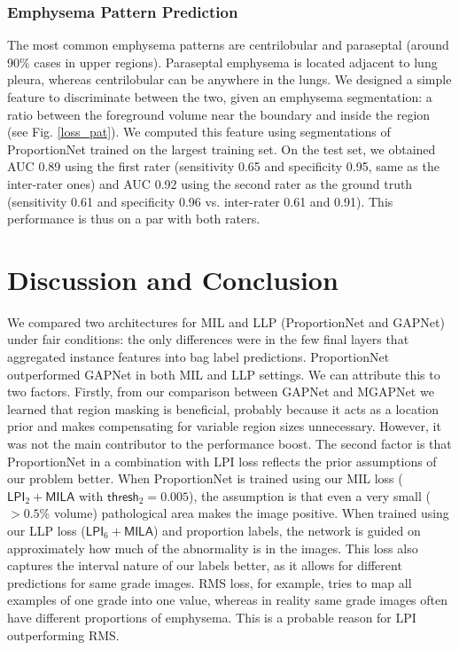 \documentclass{llncs}
\begin{document}
\subsubsection{Emphysema Pattern Prediction}

The most common emphysema patterns are centrilobular and paraseptal (around 90\% cases in upper regions).
Paraseptal emphysema is located adjacent to lung pleura, whereas centrilobular can be anywhere in the lungs.
We designed a simple feature to discriminate between the two, given an emphysema segmentation: a ratio between the foreground volume near the boundary and inside the region (see Fig. \ref{loss_pat}).
We computed this feature using segmentations of ProportionNet trained on the largest training set.
On the test set, we obtained AUC 0.89 using the first rater (sensitivity 0.65 and specificity 0.95, same as the inter-rater ones) and AUC 0.92 using the second rater as the ground truth (sensitivity 0.61 and specificity 0.96 vs. inter-rater 0.61 and 0.91).
This performance is thus on a par with both raters.

\section{Discussion and Conclusion}\label{discussion}

We compared two architectures for MIL and LLP (ProportionNet and GAPNet) under fair conditions: the only differences were in the few final layers that aggregated instance features into bag label predictions.
ProportionNet outperformed GAPNet in both MIL and LLP settings.
We can attribute this to two factors.
Firstly, from our comparison between GAPNet and MGAPNet we learned that region masking is beneficial, probably because it acts as a location prior and makes compensating for variable region sizes unnecessary.
However, it was not the main contributor to the performance boost.
The second factor is that ProportionNet in a combination with LPI loss reflects the prior assumptions of our problem better.
When ProportionNet is trained using our MIL loss ($\textsf{LPI}_2 + \textsf{MILA}$ with $\textsf{thresh}_2 = 0.005$), the assumption is that even a very small ($>0.5\%$ volume) pathological area makes the image positive.
When trained using our LLP loss ($\textsf{LPI}_6 + \textsf{MILA}$) and proportion labels, the network is guided on approximately how much of the abnormality is in the images.
This loss also captures the interval nature of our labels better, as it allows for different predictions for same grade images.
RMS loss, for example, tries to map all examples of one grade into one value, whereas in reality same grade images often have different proportions of emphysema.
This is a probable reason for LPI outperforming RMS.
\end{document}
